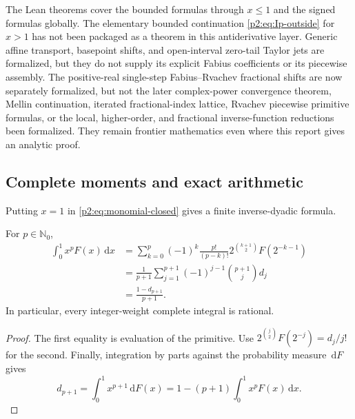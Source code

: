 \documentclass[11pt,oneside]{article}
\theoremstyle{definition}
\theoremstyle{remark}
\newcommand{\N}{\mathbb N}
\newcommand{\dd}{\,\mathrm d}
\newcommand{\1}{\mathbf 1}
\begin{document}
\begin{warning}
The Lean theorems cover the bounded formulas through $x\le1$ and the signed
formulas globally.  The elementary bounded continuation
\eqref{p2:eq:Ip-outside} for $x>1$ has not been packaged as a theorem in this
antiderivative layer.  Generic affine transport, basepoint shifts, and
open-interval zero-tail Taylor jets are formalized, but they do not supply its
explicit Fabius coefficients or its piecewise assembly.  The positive-real single-step
Fabius--Rvachev fractional shifts are now separately formalized, but not the later
complex-power convergence theorem, Mellin continuation, iterated fractional-index lattice,
Rvachev piecewise primitive
formulas, or the local, higher-order, and fractional inverse-function reductions
been formalized.  They remain
frontier mathematics even where this report gives an analytic proof.
\end{warning}

\subsection{Complete moments and exact arithmetic}
Putting $x=1$ in \eqref{p2:eq:monomial-closed} gives a finite inverse-dyadic
formula.

\begin{corollary}
\label{p2:cor:moment-bridge}
For $p\in\N_0$,
\begin{align}
 \int_0^1x^pF(x)\dd x
 &=\sum_{k=0}^{p}(-1)^k\frac{p!}{(p-k)!}
 2^{\binom{k+1}{2}}F(2^{-k-1})                             \label{p2:eq:moment-dyadic}\\
 &=\frac1{p+1}\sum_{j=1}^{p+1}(-1)^{j-1}
   \binom{p+1}{j}d_j                                      \label{p2:eq:moment-d}\\
 &=\boxed{\frac{1-d_{p+1}}{p+1}}.                         \label{p2:eq:moment-prob}
\end{align}
In particular, every integer-weight complete integral is rational.
\end{corollary}

\begin{proof}
The first equality is evaluation of the primitive.  Use
$2^{\binom j2}F(2^{-j})=d_j/j!$ for the second.  Finally, integration by parts
against the probability measure $\dd F$ gives
\[
 d_{p+1}=\int_0^1x^{p+1}\dd F(x)
 =1-(p+1)\int_0^1x^pF(x)\dd x.
\]
\end{proof}
\end{document}
